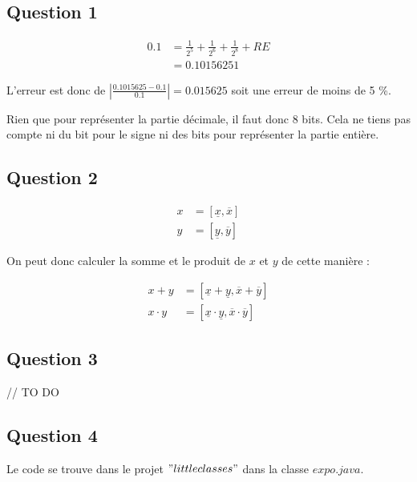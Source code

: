 \subsection{Question 1}

\begin{equation}
	\begin{aligned}
		0.1 &= \frac{1}{2^5} + \frac{1}{2^6} + \frac{1}{2^8} + RE \\
		&= 0.1015625
	1\end{aligned}
\end{equation}

L'erreur est donc de $|\frac{0.1015625 - 0.1}{0.1}| = 0.015625$ soit une erreur de moins de 5 \%.

Rien que pour représenter la partie décimale, il faut donc 8 bits. Cela ne tiens pas compte ni du bit pour le signe ni des bits pour représenter la partie entière.

\subsection{Question 2}

\begin{equation}
	\begin{aligned}
		x &= [\underline{x}, \overline{x}]\\
		y &= [\underline{y}, \overline{y}]
	\end{aligned}
\end{equation}

On peut donc calculer la somme et le produit de $x$ et $y$ de cette manière :

\begin{equation}
	\begin{aligned}
		x + y &= [\underline{x} + \underline{y}, \overline{x} + \overline{y}]\\
		x \cdot y &= [\underline{x} \cdot \underline{y}, \overline{x} \cdot \overline{y}]
	\end{aligned}
\end{equation}

\subsection{Question 3}

// TO DO

\subsection{Question 4}
Le code se trouve dans le projet $"littleclasses"$ dans la classe $expo.java$.

